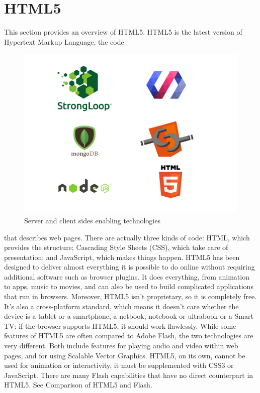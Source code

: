 \section{HTML5}
\label{sec:html5}
This section provides an overview of HTML5.
HTML5 is the latest version of Hypertext Markup Language, the code
\begin{figure}[htb]
 \centering
 \includegraphics[width=1.0\linewidth]{images/chapter3/tecnologie.jpeg}\hfill
 \caption[Server and client sides enabling  technologies]{Server and client sides enabling  technologies}
 \label{fig:fourV}
\end{figure}
that describes web pages. There are actually three kinds of code: HTML, which provides the structure; Cascading Style Sheets (CSS), which take care of presentation; and JavaScript, which makes things happen.
\newline
HTML5 has been designed to deliver almost everything it is possible to do online without requiring additional software such as browser plugins. It does everything, from animation to apps, music to movies, and can also be used to build complicated applications that run in browsers.
\newline
Moreover, HTML5 isn’t proprietary, so it is completely free. It’s also a cross-platform standard, which means it doesn’t care whether the device is a tablet or a smartphone, a netbook, notebook or ultrabook or a Smart TV: if the browser supports HTML5, it should work  flawlessly.
\newline
While some features of HTML5 are often compared to Adobe Flash, the two technologies are very different. Both include features for playing audio and video within web pages, and for using Scalable Vector Graphics. HTML5, on its own, cannot be used for animation or interactivity, it must be supplemented with CSS3 or JavaScript. There are many Flash capabilities  that have no direct counterpart in HTML5. See Comparison of HTML5 and Flash.
